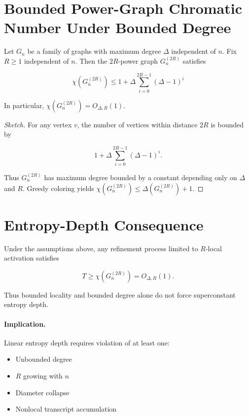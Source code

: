 \section{Bounded Power-Graph Chromatic Number Under Bounded Degree}

\begin{theorem}
Let $G_n$ be a family of graphs with maximum degree $\Delta$ independent of $n$.
Fix $R \ge 1$ independent of $n$.
Then the $2R$-power graph $G_n^{(2R)}$ satisfies

\[
\chi(G_n^{(2R)}) \le 1 + \Delta \sum_{i=0}^{2R-1} (\Delta-1)^i
\]

In particular, $\chi(G_n^{(2R)}) = O_{\Delta,R}(1)$.
\end{theorem}

\begin{proof}[Sketch]
For any vertex $v$, the number of vertices within distance $2R$ is bounded by

\[
1 + \Delta \sum_{i=0}^{2R-1} (\Delta-1)^i.
\]

Thus $G_n^{(2R)}$ has maximum degree bounded by a constant depending only on $\Delta$ and $R$.
Greedy coloring yields $\chi(G_n^{(2R)}) \le \Delta(G_n^{(2R)}) + 1$.
\end{proof}

\section{Entropy-Depth Consequence}

\begin{corollary}
Under the assumptions above, any refinement process limited to $R$-local activation satisfies

\[
T \ge \chi(G_n^{(2R)}) = O_{\Delta,R}(1).
\]

Thus bounded locality and bounded degree alone do not force superconstant entropy depth.
\end{corollary}

\paragraph{Implication.}
Linear entropy depth requires violation of at least one:
\begin{itemize}
\item Unbounded degree
\item $R$ growing with $n$
\item Diameter collapse
\item Nonlocal transcript accumulation
\end{itemize}
